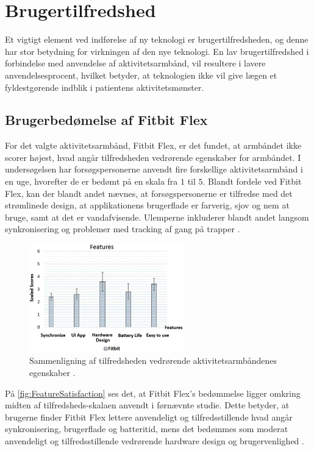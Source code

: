 \section{Brugertilfredshed}

Et vigtigt element ved indførelse af ny teknologi er brugertilfredsheden, og denne har stor betydning for virkningen af den nye teknologi. En lav brugertilfredshed i forbindelse med anvendelse af aktivitetsarmbånd, vil resultere i lavere anvendelsesprocent, hvilket betyder, at teknologien ikke vil give lægen et fyldestgørende indblik i patientens aktivitetsmønster.

\subsection{Brugerbedømelse af Fitbit Flex}

For det valgte aktivitetsarmbånd, Fitbit Flex, er det fundet, at armbåndet ikke scorer højest, hvad angår tilfredsheden vedrørende egenskaber for armbåndet. I undersøgelsen  har forsøgspersonerne anvendt fire forskellige aktivitetsarmbånd i en uge, hvorefter de er bedømt på en skala fra $1$ til $5$. Blandt fordele ved Fitbit Flex, kan der blandt andet nævnes, at forsøgspersonerne er tilfredse med det strømlinede design, at applikationens brugerflade er farverig, sjov og nem at bruge, samt at det er vandafvisende. Ulemperne inkluderer blandt andet langsom synkronisering og problemer med tracking af gang på trapper \citep{kaewkannate2016}.

\begin{figure}[H]
	\centering
	\includegraphics[width=0.6\textwidth]{figures/FeatureSatisfaction2}
	\caption{Sammenligning af tilfredsheden vedrørende aktivitetsarmbåndenes egenskaber \citep{kaewkannate2016}.}
	\label{fig:FeatureSatisfaction}
\end{figure}

På \autoref{fig:FeatureSatisfaction} ses det, at Fitbit Flex's bedømmelse ligger omkring midten af tilfredsheds-skalaen anvendt i førnævnte studie. Dette betyder, at brugerne finder Fitbit Flex lettere anvendeligt og tilfredsstillende hvad angår synkronisering, brugerflade og batteritid, mens det bedømmes som moderat anvendeligt og tilfredsstillende vedrørende hardware design og brugervenlighed \citep{kaewkannate2016}.

